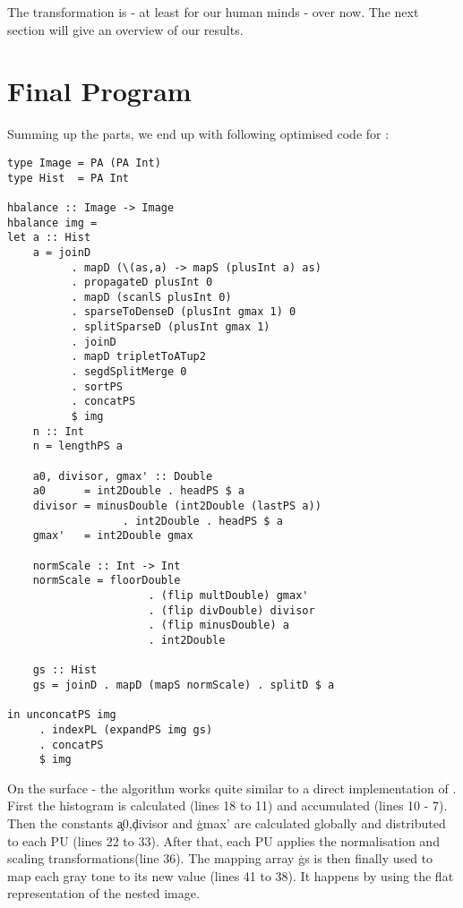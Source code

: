      The transformation is - at least for our human minds - over now. The next
     section will give an overview of our results.
         
\section{Final Program}
  Summing up the parts, we end up with following optimised code for \ndpv:
  \begin{lstlisting}
type Image = PA (PA Int)
type Hist  = PA Int

hbalance :: Image -> Image
hbalance img =
let a :: Hist
    a = joinD
          . mapD (\(as,a) -> mapS (plusInt a) as)
          . propagateD plusInt 0
          . mapD (scanlS plusInt 0)
          . sparseToDenseD (plusInt gmax 1) 0
          . splitSparseD (plusInt gmax 1)
          . joinD
          . mapD tripletToATup2
          . segdSplitMerge 0
          . sortPS
          . concatPS
          $ img
    n :: Int
    n = lengthPS a
    
    a0, divisor, gmax' :: Double
    a0      = int2Double . headPS $ a
    divisor = minusDouble (int2Double (lastPS a))
                  . int2Double . headPS $ a
    gmax'   = int2Double gmax
    
    normScale :: Int -> Int
    normScale = floorDouble
                      . (flip multDouble) gmax'
                      . (flip divDouble) divisor
                      . (flip minusDouble) a
                      . int2Double
      
    gs :: Hist
    gs = joinD . mapD (mapS normScale) . splitD $ a
    
in unconcatPS img
     . indexPL (expandPS img gs)
     . concatPS
     $ img
  \end{lstlisting} %
  On the surface - the algorithm works quite similar to a direct
  implementation of \ndpn.
  First the histogram is calculated (lines 18 to 11) and accumulated (lines 10 - 7).
  Then the constants \c{a0},\c{divisor} and \c{gmax'} are calculated globally and distributed
  to each PU (lines 22 to 33). After that, each PU applies the normalisation and scaling transformations(line 36).
  The mapping array \c{gs} is then finally used to map
  each gray tone to its new value (lines 41 to 38). It happens by using the
  flat representation of the nested image.
  
